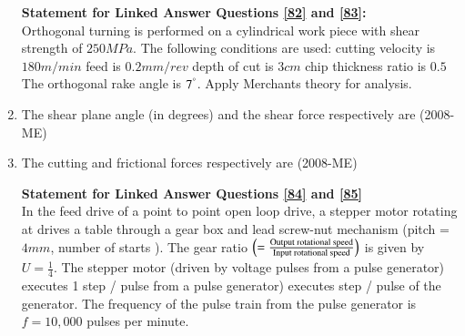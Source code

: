 \documentclass[journal]{IEEEtran}
\begin{document}
\begin{enumerate}
\begin{enumerate}
 \end{enumerate}
 \textbf{Statement for Linked Answer Questions \ref{82} and \ref{83}:} \\
 Orthogonal turning is performed on a cylindrical work piece with shear strength of $250MPa.$
 The following conditions are used: cutting velocity is $180m/min$
 feed is $0.2mm/rev$
 depth of cut is $3cm$
 chip thickness ratio is $0.5$
 The orthogonal rake angle is $7^\degree$.
 Apply Merchants theory for analysis. \\
 \item The shear plane angle (in degrees) and the shear force respectively are \label{82} \hfill(2008-ME)
 \begin{enumerate}
 \end{enumerate}
 \item The cutting and frictional forces respectively are \label{83} \hfill(2008-ME)
\begin{enumerate}
\end{enumerate}
\textbf{Statement for Linked Answer Questions \ref{84} and \ref{85}} \\
In the feed drive of a point to point open loop 
 drive, a stepper motor rotating at 
 drives a table through a gear box and lead screw-nut mechanism (pitch = $4mm$, number of starts 
). The gear ratio $\left(= \frac{\text{Output rotational speed}}{\text{Input rotational speed}}\right)$ is given by $U = \frac{1}{4}$.
 The stepper motor (driven by voltage pulses from a pulse generator) executes 1
 step / pulse from a pulse generator) executes 
 step / pulse of the generator. The frequency of the pulse train from the pulse generator is $f = 10,000$ pulses per minute. \\

\end{enumerate}
\end{document}
